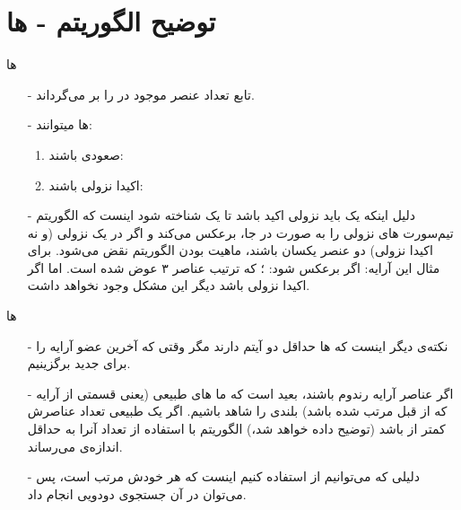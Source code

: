 \section{توضیح الگوریتم - ها}
\begin{frame}{ها}
\begin{itemize}\itemr
\item[-]
تابع 
تعداد عنصر موجود در  را بر می‌گرداند.

\item[-]
ها
میتوانند:
\begin{enumerate}\itemr
\item
صعودی باشند:

\item 
اکیدا نزولی باشند:
\end{enumerate}
\item[-]
دلیل اینکه یک  باید نزولی اکید باشد تا یک  شناخته شود اینست که الگوریتم تیم‌سورت ‌های نزولی را به صورت در جا، برعکس می‌کند و اگر در یک  نزولی (و نه اکیدا نزولی) دو عنصر یکسان باشند، ماهیت  بودن الگوریتم نقض می‌شود. برای مثال این‌ آرایه: 
اگر برعکس شود:
؛ که ترتیب عناصر ۳ عوض شده است. اما اگر اکیدا نزولی باشد دیگر این مشکل وجود نخواهد داشت.
\end{itemize}
\end{frame}

\begin{frame}{ها}
\begin{itemize}\itemr
\item[-]
نکته‌ی دیگر اینست که ها حداقل دو آیتم دارند مگر وقتی که آخرین عضو آرایه را برای  جدید برگزینیم.
\item[-]
اگر عناصر آرایه رندوم باشند، بعید است که ما های طبیعی (یعنی قسمتی از آرایه که از قبل مرتب شده باشد) بلندی را شاهد باشیم. اگر یک  طبیعی تعداد عناصرش کمتر از  باشد (توضیح داده خواهد شد،) الگوریتم با استفاده از  تعداد آنرا به حداقل اندازه‌ی  می‌رساند.

\item[-]
دلیلی که می‌توانیم از  استفاده کنیم اینست که هر  خودش مرتب است، پس می‌توان در آن جستجوی دودویی انجام داد.
\end{itemize}
\end{frame}

